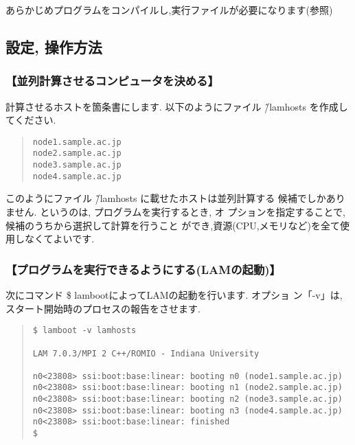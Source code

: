 \documentclass[a4paper,titlepage]{jreport}
\begin{document}
あらかじめプログラムをコンパイルし,実行ファイルが必要になります(参照)

\subsection{設定, 操作方法}

\subsubsection{【並列計算させるコンピュータを決める】}
計算させるホストを箇条書にします. 
以下のようにファイル \~/lamhosts を作成してください.

\begin{quote}
\begin{screen}
\begin{verbatim}
node1.sample.ac.jp
node2.sample.ac.jp
node3.sample.ac.jp
node4.sample.ac.jp
\end{verbatim}
\end{screen}
\end{quote}

このようにファイル \~/lamhosts に載せたホストは並列計算する
候補でしかありません. というのは, プログラムを実行するとき, オ
プションを指定することで, 候補のうちから選択して計算を行うこと
ができ,資源(CPU,メモリなど)を全て使用しなくてよいです.

\subsubsection{【プログラムを実行できるようにする(LAMの起動)】}
次にコマンド \$ lambootによってLAMの起動を行います. オプショ
ン「-v」は, スタート開始時のプロセスの報告をさせます.

\begin{quote}
\begin{screen}
\begin{verbatim}
$ lamboot -v lamhosts 

LAM 7.0.3/MPI 2 C++/ROMIO - Indiana University

n0<23808> ssi:boot:base:linear: booting n0 (node1.sample.ac.jp)
n0<23808> ssi:boot:base:linear: booting n1 (node2.sample.ac.jp)
n0<23808> ssi:boot:base:linear: booting n2 (node3.sample.ac.jp)
n0<23808> ssi:boot:base:linear: booting n3 (node4.sample.ac.jp)
n0<23808> ssi:boot:base:linear: finished
$
\end{verbatim}
\end{screen}
\end{quote}
\end{document}
